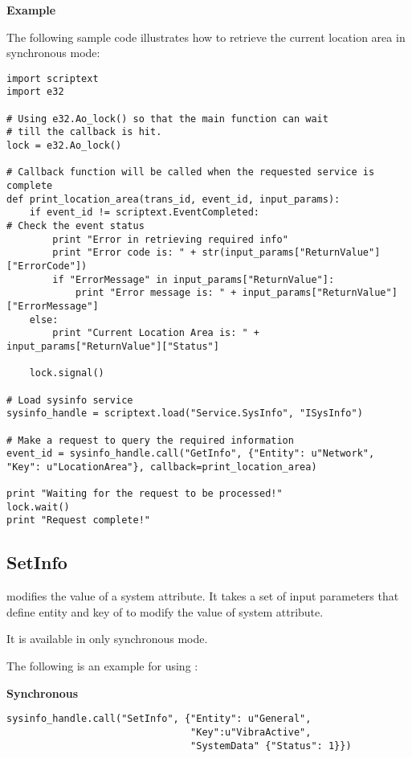 \newpage
{\bf Example} \break

The following sample code illustrates how to retrieve the current location area in synchronous mode:

\begin{verbatim}
import scriptext
import e32

# Using e32.Ao_lock() so that the main function can wait 
# till the callback is hit.
lock = e32.Ao_lock()

# Callback function will be called when the requested service is complete
def print_location_area(trans_id, event_id, input_params):
    if event_id != scriptext.EventCompleted:   
# Check the event status
        print "Error in retrieving required info"
        print "Error code is: " + str(input_params["ReturnValue"]["ErrorCode"])
        if "ErrorMessage" in input_params["ReturnValue"]:
            print "Error message is: " + input_params["ReturnValue"]["ErrorMessage"]
    else:
        print "Current Location Area is: " + input_params["ReturnValue"]["Status"]

    lock.signal()

# Load sysinfo service
sysinfo_handle = scriptext.load("Service.SysInfo", "ISysInfo")

# Make a request to query the required information
event_id = sysinfo_handle.call("GetInfo", {"Entity": u"Network", "Key": u"LocationArea"}, callback=print_location_area)

print "Waiting for the request to be processed!"
lock.wait()
print "Request complete!"
\end{verbatim}

\subsection{SetInfo}
\label{subsec:sysinfosetinfo}

 modifies the value of a system attribute. It takes a set of input parameters that define entity and key of  to modify the value of system attribute. \break

It is available in only synchronous mode.

The following is an example for using :

{\bf Synchronous} \break

\begin{verbatim}
sysinfo_handle.call("SetInfo", {"Entity": u"General",
                                "Key":u"VibraActive", 
                                "SystemData" {"Status": 1}}) 
\end{verbatim}

